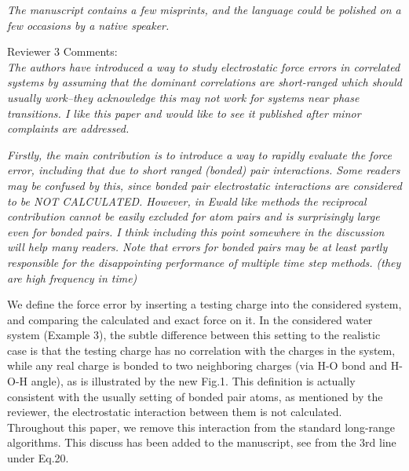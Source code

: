 \documentclass[a4paper]{article}
\begin{document}
\textit{ The manuscript contains a few misprints, and the language
  could be polished on a few occasions by a native speaker.  }


\vskip 1cm
\noindent
Reviewer 3 Comments:\\

\textit{
The authors have introduced a way to study electrostatic force errors
in correlated systems by assuming that the dominant correlations are
short-ranged which should usually work--they acknowledge this may not
work for systems near phase transitions. I like this paper and would
like to see it published after minor complaints are addressed.
}

\textit{
Firstly, the main contribution is to introduce a way to rapidly
evaluate the force error, including that due to short ranged (bonded)
pair interactions. Some readers may be confused by this, since bonded
pair electrostatic interactions are considered to be NOT
CALCULATED. However, in Ewald like methods the reciprocal contribution
cannot be easily excluded for atom pairs and is surprisingly large
even for bonded pairs. I think including this point somewhere in the
discussion will help many readers. Note that errors for bonded pairs
may be at least partly responsible for the disappointing performance
of multiple time step methods. (they are high frequency in time)
}


We define the force error by inserting a testing charge into the
considered system, and comparing the calculated and exact force on
it. In the considered water system (Example 3), the subtle difference
between this setting to the realistic case is that the testing charge
has no correlation with the charges in the system, while any real
charge is bonded to two neighboring charges (via H-O bond and H-O-H
angle), as is illustrated by the new Fig.1.
This definition is actually consistent with the usually
setting of bonded pair atoms, as mentioned by the reviewer, the
electrostatic interaction between them is not calculated.
Throughout this paper, we remove this  interaction from the
standard long-range algorithms.  This discuss has been added to
the manuscript, see from the 3rd line under Eq.20.
\end{document}
